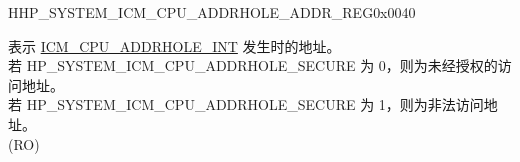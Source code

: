 \begin{register}{H}{HP\_SYSTEM\_ICM\_CPU\_ADDRHOLE\_ADDR\_REG}{0x0040}\label{regdesc:HPSYSTEMICMCPUADDRHOLEADDRREG}
%
\regnewline%
\begin{regdesc}\begin{reglist}
\label{fielddesc:HPSYSTEMICMCPUADDRHOLEADDR}\item [HP\_SYSTEM\_ICM\_CPU\_ADDRHOLE\_ADDR] 表示 \hyperref[tab:sysreg-int-sources]{ICM\_CPU\_ADDRHOLE\_INT} 发生时的地址。\\
若 HP\_SYSTEM\_ICM\_CPU\_ADDRHOLE\_SECURE 为 0，则为未经授权的访问地址。\\
若 HP\_SYSTEM\_ICM\_CPU\_ADDRHOLE\_SECURE 为 1，则为非法访问地址。\\
(RO)
\end{reglist}\end{regdesc}
\end{register}



